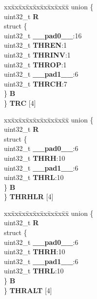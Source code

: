 \begin{DoxyCompactItemize}
\begin{tabbing}
\end{tabbing}\item 
\mbox{\label{structADC__tag_ae4bfa26705af8344bd96aea33d3d467c}} 
\begin{tabbing}
xx\=xx\=xx\=xx\=xx\=xx\=xx\=xx\=xx\=\kill
union \{\\
\>uint32\_t {\bfseries R}\\
\>struct \{\\
\>\>uint32\_t {\bfseries \_\_pad0\_\_}:16\\
\>\>uint32\_t {\bfseries THREN}:1\\
\>\>uint32\_t {\bfseries THRINV}:1\\
\>\>uint32\_t {\bfseries THROP}:1\\
\>\>uint32\_t {\bfseries \_\_pad1\_\_}:6\\
\>\>uint32\_t {\bfseries THRCH}:7\\
\>\} {\bfseries B}\\
\} {\bfseries TRC} \mbox{[}4\mbox{]}\\

\end{tabbing}\item 
\mbox{\label{structADC__tag_a75e597f8dbd00a397e8e7cce2536ca52}} 
\begin{tabbing}
xx\=xx\=xx\=xx\=xx\=xx\=xx\=xx\=xx\=\kill
union \{\\
\>uint32\_t {\bfseries R}\\
\>struct \{\\
\>\>uint32\_t {\bfseries \_\_pad0\_\_}:6\\
\>\>uint32\_t {\bfseries THRH}:10\\
\>\>uint32\_t {\bfseries \_\_pad1\_\_}:6\\
\>\>uint32\_t {\bfseries THRL}:10\\
\>\} {\bfseries B}\\
\} {\bfseries THRHLR} \mbox{[}4\mbox{]}\\

\end{tabbing}\item 
\mbox{\label{structADC__tag_ae608e5579e57ed02d75d274a076ffaa7}} 
\begin{tabbing}
xx\=xx\=xx\=xx\=xx\=xx\=xx\=xx\=xx\=\kill
union \{\\
\>uint32\_t {\bfseries R}\\
\>struct \{\\
\>\>uint32\_t {\bfseries \_\_pad0\_\_}:6\\
\>\>uint32\_t {\bfseries THRH}:10\\
\>\>uint32\_t {\bfseries \_\_pad1\_\_}:6\\
\>\>uint32\_t {\bfseries THRL}:10\\
\>\} {\bfseries B}\\
\} {\bfseries THRALT} \mbox{[}4\mbox{]}\\


\end{tabbing}
\end{DoxyCompactItemize}
